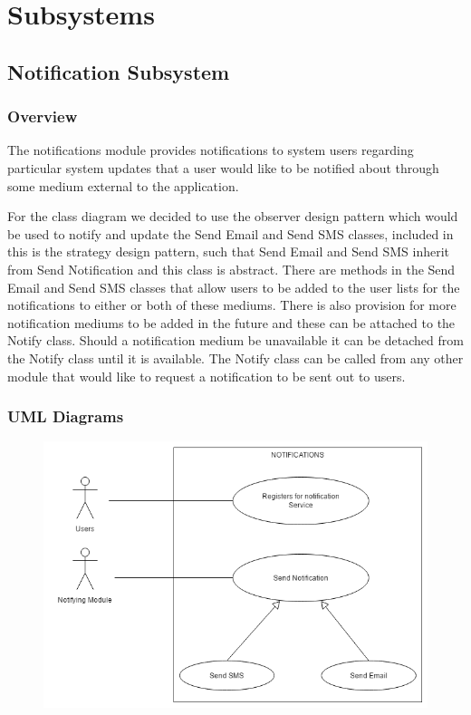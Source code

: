 \documentclass{article}
\begin{document}
    \section{Subsystems}
    
    \subsection{Notification Subsystem}
    
    \subsubsection{Overview}
        The notifications module provides notifications to system users regarding
        particular system updates that a user would like to be notified about through
        some medium external to the application.
    
    \begin{flushleft}
    
        For the class diagram we decided to use the observer design pattern which would be used to notify and update the Send Email and Send SMS classes, included in this is the strategy design pattern, such that Send Email and Send SMS inherit from Send Notification and this class is abstract. There are methods in the Send Email and Send SMS classes that allow users to be added to the user lists for the notifications to either or both of these mediums. There is also provision for more notification mediums to be added in the future and these can be attached to the Notify class. Should a notification medium be unavailable it can be detached from the Notify class until it is available. The Notify class can be called from any other module that would like to request a notification to be sent out to users.
        
    \end{flushleft}
    
    \subsubsection{UML Diagrams}
    \begin{figure}[h!]
        \includegraphics[width=\textwidth]{Notifications_Use_Case.png}
    \end{figure}
    
\end{document}

